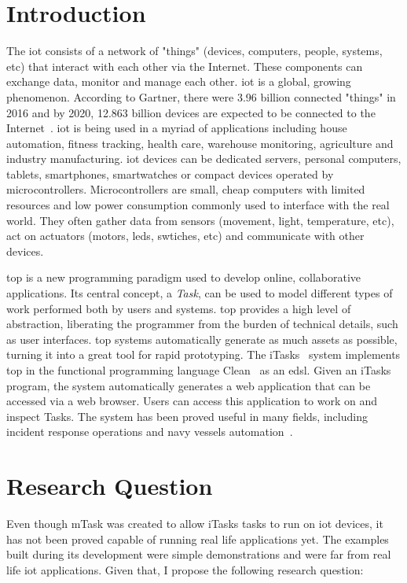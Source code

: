 \section{Introduction}
The \ac{iot} consists of a network of "things" (devices, computers, people, systems, etc) that interact with each other via the Internet. These components can exchange data, monitor and manage each other. \ac{iot} is a global, growing phenomenon. According to Gartner, there were 3.96 billion connected "things" in 2016 and by 2020, 12.863 billion devices are expected to be connected to the Internet~\cite{iot_numbers}. \ac{iot} is being used in a myriad of applications including house automation, fitness tracking, health care, warehouse monitoring, agriculture and industry manufacturing. \ac{iot} devices can be dedicated servers, personal computers, tablets, smartphones, smartwatches or compact devices operated by microcontrollers. Microcontrollers are small, cheap computers with limited resources and low power consumption commonly used to interface with the real world. They often gather data from sensors (movement, light, temperature, etc), act on actuators (motors, \acsp{led}, swtiches, etc) and communicate with other devices.

\ac{top} is a new programming paradigm used to develop online, collaborative applications. Its central concept, a \textit{Task}, can be used to model different types of work performed both by users and systems. \ac{top} provides a high level of abstraction, liberating the programmer from the burden of technical details, such as user interfaces. \ac{top} systems automatically generate as much assets as possible, turning it into a great tool for rapid prototyping. The iTasks~\cite{top} system implements \ac{top} in the functional programming language Clean~\cite{clean} as an \ac{edsl}. Given an iTasks program, the system automatically generates a web application that can be accessed via a web browser. Users can access this application to work on and inspect Tasks. The system has been proved useful in many fields, including incident response operations and navy vessels automation~\cite{incidone,navy}.


\section{Research Question}
Even though mTask was created to allow iTasks tasks to run on \acs{iot} devices, it has not been proved capable of running real life applications yet. The examples built during its development were simple demonstrations and were far from real life \acs{iot} applications. Given that, I propose the following research question:


